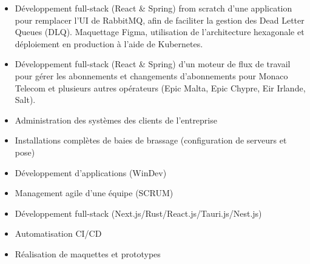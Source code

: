\documentclass[10pt,a4paper,ragged2e,withhyper]{altacv}
\begin{document}

\makecvheader


\begin{paracol}{2}


\begin{itemize}
    \item Développement full-stack (React \& Spring) from scratch d'une application pour remplacer l'UI de RabbitMQ, afin de faciliter la gestion des Dead Letter Queues (DLQ). Maquettage Figma, utilisation de l'architecture hexagonale et déploiement en production à l'aide de Kubernetes.
    \item Développement  full-stack (React \& Spring) d'un moteur de flux de travail pour gérer les abonnements et changements d’abonnements pour Monaco Telecom et plusieurs autres opérateurs (Epic Malta, Epic Chypre, Eir Irlande, Salt).
\end{itemize}

\divider

\begin{itemize}
    \item Administration des systèmes des clients de l'entreprise
    \item Installations complètes de baies de brassage (configuration de serveurs et pose)
    \item Développement d'applications (WinDev)
\end{itemize}


\begin{itemize}
    \item Management agile d'une équipe (SCRUM)
    \item Développement full-stack (Next.js/Rust/React.js/Tauri.js/Nest.js)
    \item Automatisation CI/CD
    \item Réalisation de maquettes et prototypes
\end{itemize}


\end{paracol}
\end{document}
